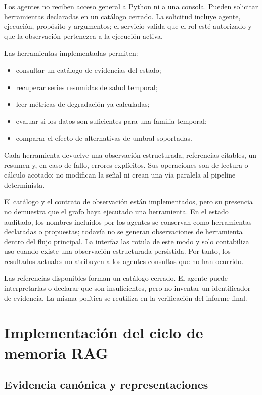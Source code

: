 Los agentes no reciben acceso general a Python ni a una consola. Pueden
solicitar herramientas declaradas en un catálogo cerrado. La solicitud incluye
agente, ejecución, propósito y argumentos; el servicio valida que el rol esté
autorizado y que la observación pertenezca a la ejecución activa.

Las herramientas implementadas permiten:

\begin{itemize}
  \item consultar un catálogo de evidencias del estado;
  \item recuperar series resumidas de salud temporal;
  \item leer métricas de degradación ya calculadas;
  \item evaluar si los datos son suficientes para una familia temporal;
  \item comparar el efecto de alternativas de umbral soportadas.
\end{itemize}

Cada herramienta devuelve una observación estructurada, referencias citables,
un resumen y, en caso de fallo, errores explícitos. Sus operaciones son de
lectura o cálculo acotado; no modifican la señal ni crean una vía paralela al
pipeline determinista.

El catálogo y el contrato de observación están implementados, pero su presencia
no demuestra que el grafo haya ejecutado una herramienta. En el estado auditado,
los nombres incluidos por los agentes se conservan como herramientas declaradas
o propuestas; todavía no se generan observaciones de herramienta dentro del
flujo principal. La interfaz las rotula de este modo y solo contabiliza uso
cuando existe una observación estructurada persistida. Por tanto, los resultados
actuales no atribuyen a los agentes consultas que no han ocurrido.

Las referencias disponibles forman un catálogo cerrado. El agente puede
interpretarlas o declarar que son insuficientes, pero no inventar un
identificador de evidencia. La misma política se reutiliza en la verificación
del informe final.

\section{Implementación del ciclo de memoria RAG}

\subsection{Evidencia canónica y representaciones}

